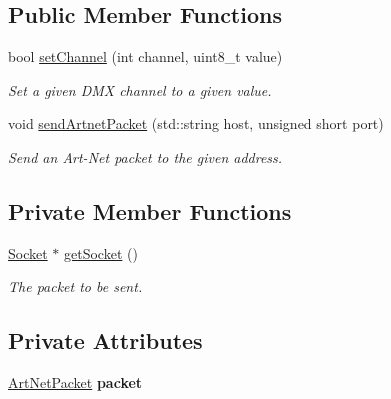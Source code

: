 \subsection*{Public Member Functions}
\begin{DoxyCompactItemize}
\item 
\mbox{\label{classArtnet_ac3de43f38fbdcc4f737c56c7dd071eb4}} 
bool \hyperlink{classArtnet_ac3de43f38fbdcc4f737c56c7dd071eb4}{set\+Channel} (int channel, uint8\+\_\+t value)
\begin{DoxyCompactList}\small\item\em Set a given D\+MX channel to a given value. \end{DoxyCompactList}\item 
\mbox{\label{classArtnet_aeb06c6aa3357345140dc9bf6ab024b9e}} 
void \hyperlink{classArtnet_aeb06c6aa3357345140dc9bf6ab024b9e}{send\+Artnet\+Packet} (std\+::string host, unsigned short port)
\begin{DoxyCompactList}\small\item\em Send an Art-\/\+Net packet to the given address. \end{DoxyCompactList}\end{DoxyCompactItemize}
\subsection*{Private Member Functions}
\begin{DoxyCompactItemize}
\item 
\hyperlink{classSocket}{Socket} $\ast$ \hyperlink{classArtnet_a2ad460313cfce83663c5493ffcebb380}{get\+Socket} ()
\begin{DoxyCompactList}\small\item\em The packet to be sent. \end{DoxyCompactList}\end{DoxyCompactItemize}
\subsection*{Private Attributes}
\begin{DoxyCompactItemize}
\item 
\mbox{\label{classArtnet_a9388aaec894174e2d0f39b6f14ea5f50}} 
\hyperlink{structArtnet_1_1ArtNetPacket}{Art\+Net\+Packet} {\bfseries packet}
\end{DoxyCompactItemize}


